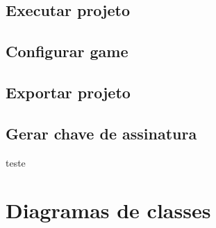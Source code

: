 \documentclass[12pt,twoside,openright,a4paper,english,brazil,sumario=tradicional]{abntex2}
\begin{document}
\begin{anexosenv}
   \section{Executar projeto}


   \section{Configurar game}


   \section{Exportar projeto}


   \section{Gerar chave de assinatura}

teste

   \chapter{Diagramas de classes}
   \label{chap:diagramas}
   
\end{anexosenv}
\printindex
\end{document}
